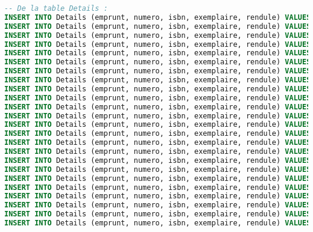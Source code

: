 \documentclass[10pt, oneside]{article}
\begin{document}
\begin{lstlisting}[language=sql, title=Question 3, label=QII3]
-- De la table Details :
INSERT INTO Details (emprunt, numero, isbn, exemplaire, rendule) VALUES (1, 1, 2038704015, 1, SYSDATE-195);
INSERT INTO Details (emprunt, numero, isbn, exemplaire, rendule) VALUES (1, 2, 2070367177, 2, SYSDATE-190);
INSERT INTO Details (emprunt, numero, isbn, exemplaire, rendule) VALUES (2, 1, 2080720872, 1, SYSDATE-180);
INSERT INTO Details (emprunt, numero, isbn, exemplaire, rendule) VALUES (2, 2, 2203314168, 1, SYSDATE-179);
INSERT INTO Details (emprunt, numero, isbn, exemplaire, rendule) VALUES (3, 1, 2038704015, 1, SYSDATE-170);
INSERT INTO Details (emprunt, numero, isbn, exemplaire, rendule) VALUES (4, 1, 2203314168, 2, SYSDATE-155);
INSERT INTO Details (emprunt, numero, isbn, exemplaire, rendule) VALUES (4, 2, 2080720872, 1, SYSDATE-155);
INSERT INTO Details (emprunt, numero, isbn, exemplaire, rendule) VALUES (4, 3, 2266085816, 1, SYSDATE-159);
INSERT INTO Details (emprunt, numero, isbn, exemplaire, rendule) VALUES (5, 1, 2038704015, 2, SYSDATE-140);
INSERT INTO Details (emprunt, numero, isbn, exemplaire, rendule) VALUES (6, 1, 2266085816, 2, SYSDATE-141);
INSERT INTO Details (emprunt, numero, isbn, exemplaire, rendule) VALUES (6, 2, 2080720872, 2, SYSDATE-130);
INSERT INTO Details (emprunt, numero, isbn, exemplaire, rendule) VALUES (6, 3, 2746021285, 2, SYSDATE-133);
INSERT INTO Details (emprunt, numero, isbn, exemplaire, rendule) VALUES (7, 1, 2070367177, 2, SYSDATE-100);
INSERT INTO Details (emprunt, numero, isbn, exemplaire, rendule) VALUES (8, 1, 2080720872, 1, SYSDATE-116);
INSERT INTO Details (emprunt, numero, isbn, exemplaire, rendule) VALUES (9, 1, 2038704015, 1, SYSDATE-100);
INSERT INTO Details (emprunt, numero, isbn, exemplaire, rendule) VALUES (10, 1, 2080720872, 2, SYSDATE-107);
INSERT INTO Details (emprunt, numero, isbn, exemplaire, rendule) VALUES (10, 2, 2746026090, 1, SYSDATE-78);
INSERT INTO Details (emprunt, numero, isbn, exemplaire, rendule) VALUES (11, 1, 2746021285, 1, SYSDATE-81);
INSERT INTO Details (emprunt, numero, isbn, exemplaire, rendule) VALUES (12, 1, 2203314168, 1, SYSDATE-86);
INSERT INTO Details (emprunt, numero, isbn, exemplaire, rendule) VALUES (12, 2, 2038704015, 1, SYSDATE-60);
INSERT INTO Details (emprunt, numero, isbn, exemplaire, rendule) VALUES (13, 1, 2070367177, 1, SYSDATE-65);
INSERT INTO Details (emprunt, numero, isbn, exemplaire, rendule) VALUES (14, 1, 2266091611, 1, SYSDATE-66);
INSERT INTO Details (emprunt, numero, isbn, exemplaire, rendule) VALUES (15, 1, 2266085816, 1, SYSDATE-50);
INSERT INTO Details (emprunt, numero, isbn, exemplaire, rendule) VALUES (16, 1, 2253010219, 2, SYSDATE-41);

\end{lstlisting}
\end{document}
